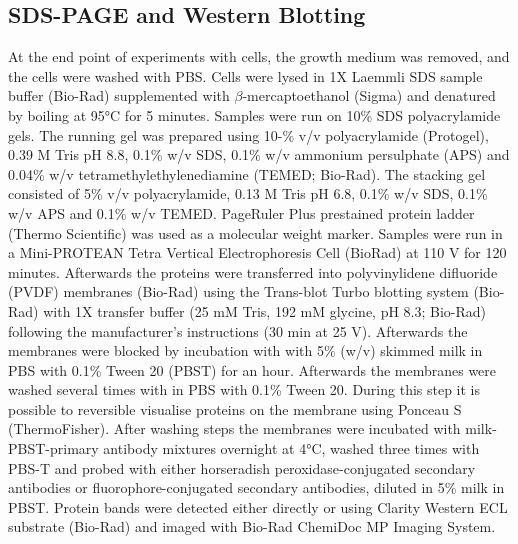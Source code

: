 \subsection{SDS-PAGE and Western Blotting} \label{SDS-PAGE and Western Blotting}
At the end point of experiments with cells, the growth medium was removed, and the cells were washed with PBS. Cells were lysed in 1X Laemmli SDS sample buffer (Bio-Rad) supplemented with \(\beta\)-mercaptoethanol (Sigma) and denatured by boiling at 95°C for 5 minutes. Samples were run on 10\% SDS polyacrylamide gels. The running gel was prepared using 10-\% v/v polyacrylamide (Protogel), 0.39 M Tris pH 8.8, 0.1\% w/v SDS, 0.1\% w/v ammonium persulphate (APS) and 0.04\% w/v tetramethylethylenediamine (TEMED; Bio-Rad). The stacking gel consisted of 5\% v/v polyacrylamide, 0.13 M Tris pH 6.8, 0.1\% w/v SDS, 0.1\% w/v APS and 0.1\% w/v TEMED. PageRuler Plus prestained protein ladder (Thermo Scientific) was used as a molecular weight marker. Samples were run in a Mini-PROTEAN Tetra Vertical Electrophoresis Cell (BioRad) at 110 V for 120 minutes. Afterwards the proteins were transferred into polyvinylidene difluoride (PVDF) membranes (Bio-Rad) using the Trans-blot Turbo blotting system (Bio-Rad) with 1X transfer buffer (25 mM Tris, 192 mM glycine, pH 8.3; Bio-Rad) following the manufacturer’s instructions (30 min at 25 V). Afterwards the membranes were blocked by incubation with with 5\% (w/v) skimmed milk in PBS with 0.1\% Tween 20 (PBST) for an hour. Afterwards the membranes were washed several times with in PBS with 0.1\% Tween 20. During this step it is possible to reversible visualise proteins on the membrane using Ponceau S (ThermoFisher). After washing steps the membranes were incubated with milk-PBST-primary antibody mixtures overnight at 4°C, washed three times with PBS-T and probed with either horseradish peroxidase-conjugated secondary antibodies or fluorophore-conjugated secondary antibodies, diluted in 5\% milk in PBST. Protein bands were detected either directly or using Clarity Western ECL substrate (Bio-Rad) and imaged with Bio-Rad ChemiDoc MP Imaging System.




